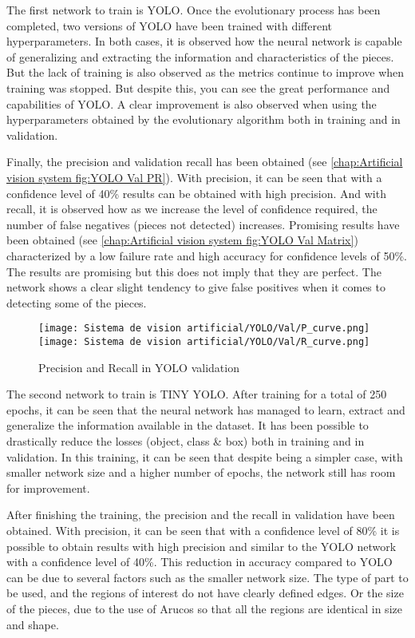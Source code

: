 {The first network to train is YOLO. Once the evolutionary process has been completed, two versions of YOLO have been trained with different hyperparameters. In both cases, it is observed how the neural network is capable of generalizing and extracting the information and characteristics of the pieces. But the lack of training is also observed as the metrics continue to improve when training was stopped. But despite this, you can see the great performance and capabilities of YOLO. A clear improvement is also observed when using the hyperparameters obtained by the evolutionary algorithm both in training and in validation.

Finally, the precision and validation recall has been obtained (see \autoref{chap:Artificial vision system fig:YOLO Val PR}). With precision, it can be seen that with a confidence level of 40\% results can be obtained with high precision. And with recall, it is observed how as we increase the level of confidence required, the number of false negatives (pieces not detected) increases. Promising results have been obtained (see \autoref{chap:Artificial vision system fig:YOLO Val Matrix}) characterized by a low failure rate and high accuracy for confidence levels of 50\%. The results are promising but this does not imply that they are perfect. The network shows a clear slight tendency to give false positives when it comes to detecting some of the pieces.

\begin{figure}[H]
	\centering
    \texttt{[image: Sistema de vision artificial/YOLO/Val/P\_curve.png]} \hfill
    \texttt{[image: Sistema de vision artificial/YOLO/Val/R\_curve.png]}
	\caption{Precision and Recall in YOLO validation}
	\label{chap:Abstract fig:YOLO Val PR}
\end{figure}

The second network to train is TINY YOLO. After training for a total of 250 epochs, it can be seen that the neural network has managed to learn, extract and generalize the information available in the dataset. It has been possible to drastically reduce the losses (object, class \& box) both in training and in validation. In this training, it can be seen that despite being a simpler case, with smaller network size and a higher number of epochs, the network still has room for improvement.

After finishing the training, the precision and the recall in validation have been obtained. With precision, it can be seen that with a confidence level of 80\% it is possible to obtain results with high precision and similar to the YOLO network with a confidence level of 40\%. This reduction in accuracy compared to YOLO can be due to several factors such as the smaller network size. The type of part to be used, and the regions of interest do not have clearly defined edges. Or the size of the pieces, due to the use of Arucos so that all the regions are identical in size and shape.

}
